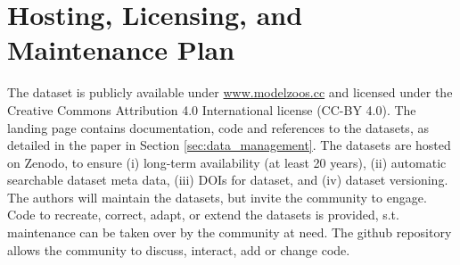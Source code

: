 \section{Hosting, Licensing, and Maintenance Plan}
The dataset is publicly available under \href{www.modelzoos.cc}{www.modelzoos.cc} and licensed under the Creative Commons Attribution 4.0 International license (CC-BY 4.0).
The landing page contains documentation, code and references to the datasets, as detailed in the paper in Section \ref{sec:data_management}.
The datasets are hosted on Zenodo, to ensure (i) long-term availability (at least 20 years), (ii) automatic searchable dataset meta data, (iii) DOIs for dataset, and (iv) dataset versioning. 
The authors will maintain the datasets, but invite the community to engage. Code to recreate, correct, adapt, or extend the datasets is provided, s.t. maintenance can be taken over by the community at need. The github repository allows the community to discuss, interact, add or change code. 
